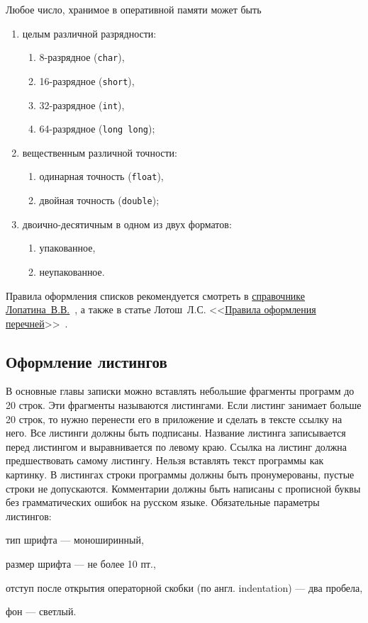 \documentclass[14pt]{extarticle}
\begin{document}
\begin{tcolorbox}[title={Пример нумерованного списка}, before upper={\setlength{\parindent}{1.25cm}}]
\par Любое число, хранимое в оперативной памяти может быть
\begin{enumerate}
\item целым различной разрядности:
	\begin{enumerate}
		\item 8-разрядное (\texttt{char}),
		\item 16-разрядное (\texttt{short}),	
		\item 32-разрядное (\texttt{int}),	
		\item 64-разрядное (\texttt{long long});
	\end{enumerate}
\item вещественным различной точности: 
	\begin{enumerate}
		\item одинарная точность (\texttt{float}),
		\item двойная точность (\texttt{double});
	\end{enumerate}
\item двоично-десятичным в одном из двух форматов:
	\begin{enumerate}
		\item упакованное,
		\item неупакованное.
	\end{enumerate}
\end{enumerate}
\end{tcolorbox}

Правила оформления списков рекомендуется смотреть в \href{https://vk.com/wall-36387183_1421}{справочнике Лопатина~В.В.}~\cite[с. 320]{lopatin}, а также в статье Лотош~Л.С. <<\href{https://delo-press.ru/journals/documents/oformlenie-dokumentov/34821-pravila-oformleniya-perechney/}{Правила оформления перечней}>>~\cite{lotosh}.

\subsection{Оформление листингов}
В основные главы записки можно вставлять небольшие фрагменты программ до 20 строк. Эти фрагменты называются листингами. Если листинг занимает больше 20 строк, то нужно перенести его в приложение и сделать в тексте ссылку на него. Все листинги должны быть подписаны. Название листинга записывается перед листингом и выравнивается по левому краю. Ссылка на листинг должна предшествовать самому листингу. Нельзя вставлять текст программы как картинку. 
В листингах строки программы должны быть пронумерованы, пустые строки не допускаются. Комментарии должны быть написаны с прописной буквы без грамматических ошибок на русском языке.  Обязательные параметры листингов:
\par тип шрифта --- моноширинный,
\par размер шрифта --- не более 10 пт., 
\par отступ после открытия операторной скобки (по англ. indentation) --- два пробела,
\par фон --- светлый.
\end{document}
